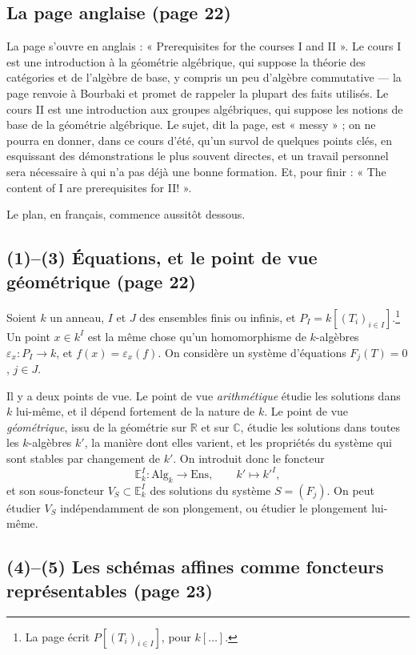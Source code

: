 \documentclass[11pt,a4paper]{article}
\begin{document}
\subsection*{La page anglaise (page 22)}

La page s'ouvre en anglais : « Prerequisites for the courses I and II ». Le cours
I est une introduction à la géométrie algébrique, qui suppose la théorie des
catégories et de l'algèbre de base, y compris un peu d'algèbre commutative --- la
page renvoie à Bourbaki et promet de rappeler la plupart des faits utilisés.
Le cours II est une introduction aux groupes algébriques, qui suppose les
notions de base de la géométrie algébrique. Le sujet, dit la page, est
« messy » ; on ne pourra en donner, dans ce cours d'été, qu'un survol de
quelques points clés, en esquissant des démonstrations le plus souvent
directes, et un travail personnel sera nécessaire à qui n'a pas déjà une bonne
formation. Et, pour finir : « The content of I are prerequisites for II! ».

Le plan, en français, commence aussitôt dessous.

\subsection*{(1)--(3) Équations, et le point de vue géométrique (page 22)}

Soient $k$ un anneau, $I$ et $J$ des ensembles finis ou infinis, et
$P_I = k[(T_i)_{i \in I}]$.\footnote{La page écrit $P[(T_i)_{i \in I}]$, pour
$k[\ldots]$.} Un point $x \in k^I$ est la même chose qu'un homomorphisme de
$k$-algèbres $\varepsilon_x : P_I \to k$, et $f(x) = \varepsilon_x(f)$. On
considère un système d'équations $F_j(T) = 0$, $j \in J$.

Il y a deux points de vue. Le point de vue \emph{arithmétique} étudie les
solutions dans $k$ lui-même, et il dépend fortement de la nature de $k$. Le
point de vue \emph{géométrique}, issu de la géométrie sur $\mathbb{R}$ et sur
$\mathbb{C}$, étudie les solutions dans toutes les $k$-algèbres $k'$, la manière
dont elles varient, et les propriétés du système qui sont stables par
changement de $k'$. On introduit donc le foncteur
\[
\mathbb{E}^I_k : \mathrm{Alg}_k \to \mathrm{Ens}, \qquad k' \longmapsto k'^I ,
\]
et son sous-foncteur $V_S \subset \mathbb{E}^I_k$ des solutions du système
$S = (F_j)$. On peut étudier $V_S$ indépendamment de son plongement, ou étudier le
plongement lui-même.

\subsection*{(4)--(5) Les schémas affines comme foncteurs représentables (page 23)}
\end{document}
